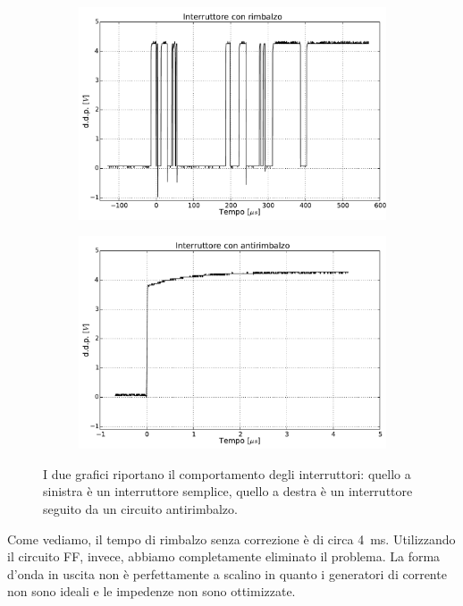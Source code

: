 \begin{figure}[htpc]
\centering
	\begin{subfigure}[hc]{.49\textwidth}
		\centering
		\includegraphics[width=.99\textwidth]{../E11/latex/rimb.pdf}
		\caption{}
		\label{gr11:rimb}
        \end{subfigure}%
        \begin{subfigure}[hc]{.49\textwidth}
		\centering
		\includegraphics[width=.99\textwidth]{../E11/latex/antirimb.pdf}
		\caption{}
		\label{gr11:no-rimb}
        \end{subfigure}
\caption{I due grafici riportano il comportamento degli interruttori: quello a sinistra è un interruttore semplice, quello a destra è un interruttore seguito da un circuito antirimbalzo.}
\end{figure}

Come vediamo, il tempo di rimbalzo senza correzione è di circa \SI{4}{\milli\second}.
Utilizzando il circuito FF, invece, abbiamo completamente eliminato il problema.
La forma d'onda in uscita non è perfettamente a scalino in quanto i generatori di corrente non sono ideali e le impedenze non sono ottimizzate.

